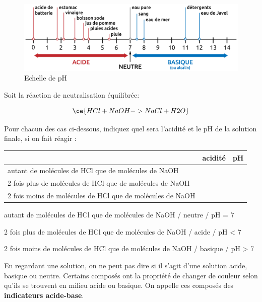 \documentclass[
  11pt,
  french,
  a4paper,
  openany]{book}
\begin{document}
\begin{figure}

{\centering \includegraphics[width=0.9\linewidth]{images/pH-echelle} 

}

\caption{Echelle de pH}\label{fig:pH-echelle}
\end{figure}

\newpage

\begin{Exercise}
Soit la réaction de neutralisation équilibrée:

\[ \ce{HCl + NaOH -> NaCl + H2O} \]

Pour chacun des cas ci-dessous, indiquez quel sera l'acidité et le pH de la solution finale, si on fait réagir :

\end{Exercise}

\begin{longtable}[]{@{}lcc@{}}
\toprule
& acidité & pH\tabularnewline
\midrule
\endhead
autant de molécules de HCl que de molécules de NaOH & &\tabularnewline
2 fois plus de molécules de HCl que de molécules de NaOH & &\tabularnewline
2 fois moins de molécules de HCl que de molécules de NaOH & &\tabularnewline
\bottomrule
\end{longtable}

\begin{Answer}
autant de molécules de HCl que de molécules de NaOH / neutre / pH = 7

2 fois plus de molécules de HCl que de molécules de NaOH / acide / pH \textless{} 7

2 fois moins de molécules de HCl que de molécules de NaOH / basique / pH \textgreater{} 7

\end{Answer}

En regardant une solution, on ne peut pas dire si il s'agit d'une solution acide, basique ou neutre. Certains composés ont la propriété de changer de couleur selon qu'ils se trouvent en milieu acide ou basique. On appelle ces composés des \textbf{indicateurs acide-base}.
\end{document}
